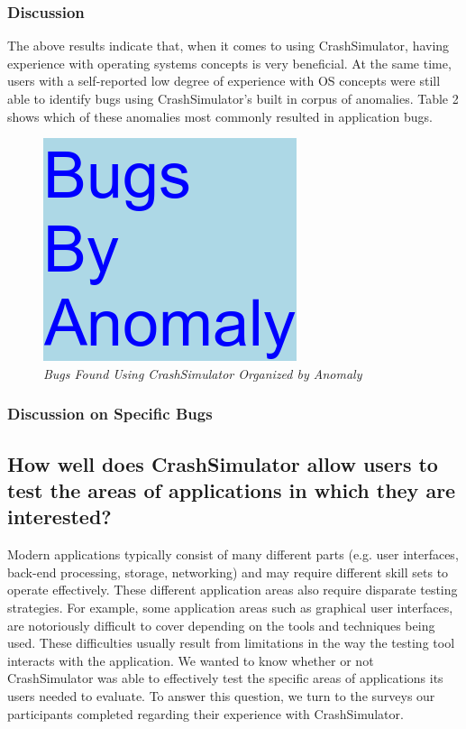 \subsubsection{Discussion}

The above results indicate that, when it comes to using CrashSimulator,
having experience with operating systems concepts is very beneficial.  At
the same time, users with a self-reported low degree of experience with OS
concepts were still able to identify bugs using CrashSimulator's built in
corpus of anomalies.  Table 2 shows which of these anomalies most commonly
resulted in application bugs.

\begin{figure}[t]
  \center{}
  \includegraphics[scale=.5]{images/anomaly}
  \caption{\emph{Bugs Found Using CrashSimulator Organized by Anomaly}}
  \label{fig-tool-anomaly}
\end{figure}


\subsubsection{Discussion on Specific Bugs}



\subsection{How well does CrashSimulator allow users to test the areas of
applications in which they are interested?}

Modern applications typically consist of many different parts (e.g. user
interfaces,  back-end processing, storage, networking) and may require
different skill sets to operate effectively.  These different application
areas also require disparate testing strategies.  For example, some
application areas such as graphical user interfaces, are notoriously
difficult to cover depending on the tools and techniques being used.  These
difficulties usually result from limitations in the way the testing tool
interacts with the application. We wanted to know whether or not
CrashSimulator was able to effectively test the specific areas of
applications its users needed to evaluate.  To answer this question, we
turn to the surveys our participants completed regarding their experience
with CrashSimulator.


